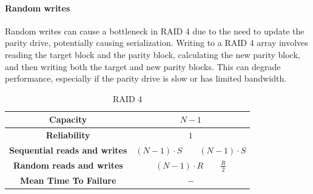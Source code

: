 \paragraph*{Random writes}
Random writes can cause a bottleneck in RAID 4 due to the need to update the parity drive, potentially causing serialization.
 Writing to a RAID 4 array involves reading the target block and the parity block, calculating the new parity block, and then writing both the target and new parity blocks. 
This can degrade performance, especially if the parity drive is slow or has limited bandwidth.
\begin{table}[H]
    \centering
    \begin{tabular}{|cc|}
    \hline
    \textbf{Capacity}                    & $N-1$                                                                  \\ \hline
    \textbf{Reliability}                 & $1$                                                                    \\ \hline
    \textbf{Sequential reads and writes} & $(N-1)\cdot S \qquad (N-1)\cdot S$                                     \\ \hline
    \textbf{Random reads and writes}     & $(N-1)\cdot R \qquad \frac{R}{2}$                                      \\ \hline
    \textbf{Mean Time To Failure}        & $-$ \\ \hline
    \end{tabular}
    \caption{RAID 4}
\end{table}

